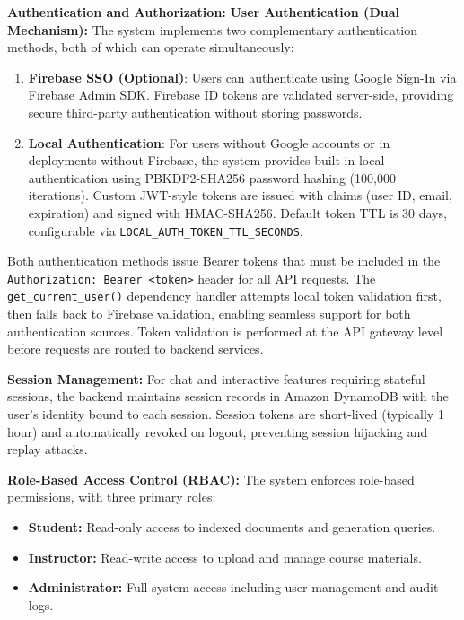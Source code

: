 \textbf{Authentication and Authorization:} \textbf{User Authentication (Dual Mechanism):} The system implements two complementary authentication methods, both of which can operate simultaneously:

\begin{enumerate}
    \item \textbf{Firebase SSO (Optional)}: Users can authenticate using Google Sign-In via Firebase Admin SDK. Firebase ID tokens are validated server-side, providing secure third-party authentication without storing passwords.
    \item \textbf{Local Authentication}: For users without Google accounts or in deployments without Firebase, the system provides built-in local authentication using PBKDF2-SHA256 password hashing (100,000 iterations). Custom JWT-style tokens are issued with claims (user ID, email, expiration) and signed with HMAC-SHA256. Default token TTL is 30 days, configurable via \texttt{LOCAL\_AUTH\_TOKEN\_TTL\_SECONDS}.
\end{enumerate}

Both authentication methods issue Bearer tokens that must be included in the \texttt{Authorization: Bearer <token>} header for all API requests. The \texttt{get\_current\_user()} dependency handler attempts local token validation first, then falls back to Firebase validation, enabling seamless support for both authentication sources. Token validation is performed at the API gateway level before requests are routed to backend services.

\textbf{Session Management:} For chat and interactive features requiring stateful sessions, the backend maintains session records in Amazon DynamoDB with the user's identity bound to each session. Session tokens are short-lived (typically 1 hour) and automatically revoked on logout, preventing session hijacking and replay attacks.

\textbf{Role-Based Access Control (RBAC):} The system enforces role-based permissions, with three primary roles:
\begin{itemize}
    \item \textbf{Student:} Read-only access to indexed documents and generation queries.
    \item \textbf{Instructor:} Read-write access to upload and manage course materials.
    \item \textbf{Administrator:} Full system access including user management and audit logs.
\end{itemize}

